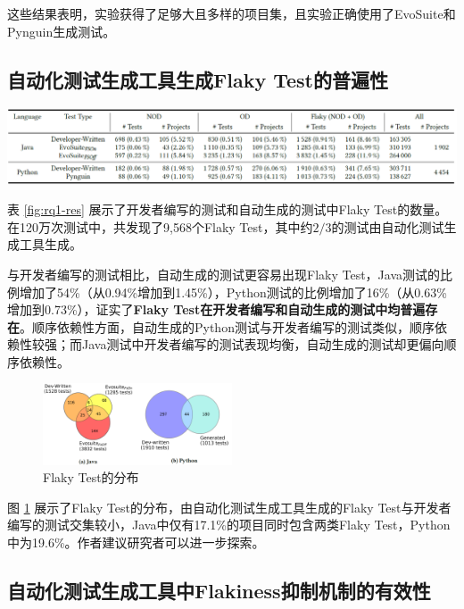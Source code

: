 \documentclass{article}
\newcommand{\flakyTest}{Flaky Test}
\begin{document}
这些结果表明，实验获得了足够大且多样的项目集，且实验正确使用了EvoSuite和Pynguin生成测试。

\subsection{自动化测试生成工具生成\flakyTest 的普遍性}

\begin{table}[htbp]
\centering
\includegraphics[width=\textwidth]{img/RQ1_res.png}
\caption{开发者编写的测试和自动生成的测试中\flakyTest 的数量}
\label{fig:rq1-res}
\end{table}

表 \ref{fig:rq1-res} 展示了开发者编写的测试和自动生成的测试中\flakyTest 的数量。在120万次测试中，共发现了9,568个\flakyTest ，其中约$2/3$的测试由自动化测试生成工具生成。

与开发者编写的测试相比，自动生成的测试更容易出现\flakyTest ，Java测试的比例增加了54\%（从0.94\%增加到1.45\%），Python测试的比例增加了16\%（从0.63\%增加到0.73\%），证实了\textbf{\flakyTest 在开发者编写和自动生成的测试中均普遍存在}。顺序依赖性方面，自动生成的Python测试与开发者编写的测试类似，顺序依赖性较强；而Java测试中开发者编写的测试表现均衡，自动生成的测试却更偏向顺序依赖性。

\begin{figure}[htbp]
\centering
\includegraphics[width=0.5\textwidth]{img/RQ1_res2.png}
\caption{\flakyTest 的分布}
\label{fig:rq1-res2}
\end{figure}

图 \ref{fig:rq1-res2} 展示了\flakyTest 的分布，由自动化测试生成工具生成的\flakyTest 与开发者编写的测试交集较小，Java中仅有17.1\%的项目同时包含两类\flakyTest ，Python中为19.6\%。作者建议研究者可以进一步探索。

\subsection{自动化测试生成工具中Flakiness抑制机制的有效性}
\end{document}
